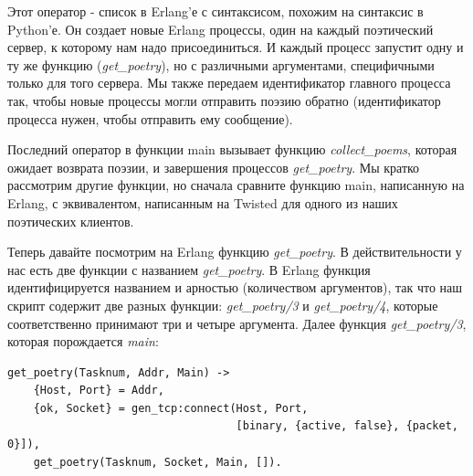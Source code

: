 Этот оператор - список в Erlang'е с синтаксисом, 
похожим на синтаксис в Python'е. Он создает новые Erlang 
процессы, один на каждый поэтический сервер, к которому 
нам надо присоединиться. И каждый процесс запустит одну и ту же 
функцию (\textit{get\_poetry}), но с различными аргументами, 
специфичными только для того сервера. Мы также передаем идентификатор  
главного процесса так, чтобы новые процессы могли отправить 
поэзию обратно (идентификатор процесса нужен, чтобы отправить ему 
сообщение).


Последний оператор в функции main вызывает функцию 
\textit{collect\_poems}, которая ожидает возврата 
поэзии, и завершения процессов \textit{get\_poetry}. 
Мы кратко рассмотрим другие функции, но сначала сравните 
функцию main, написанную на Erlang, с эквивалентом, 
написанным на Twisted для одного из наших поэтических клиентов.



Теперь давайте посмотрим на Erlang функцию \textit{get\_poetry}. 
В действительности у нас есть две функции с названием \textit{get\_poetry}. 
В Erlang функция идентифицируется названием и арностью (количеством 
аргументов), так что наш скрипт содержит две разных функции: \textit{get\_poetry/3} 
и \textit{get\_poetry/4}, которые соответственно принимают три и четыре аргумента. 
Далее функция \textit{get\_poetry/3}, которая порождается \textit{main}:

\begin{scriptsize}\begin{verbatim}
get_poetry(Tasknum, Addr, Main) ->
    {Host, Port} = Addr,
    {ok, Socket} = gen_tcp:connect(Host, Port,
                                   [binary, {active, false}, {packet, 0}]),
    get_poetry(Tasknum, Socket, Main, []).
\end{verbatim}\end{scriptsize}


